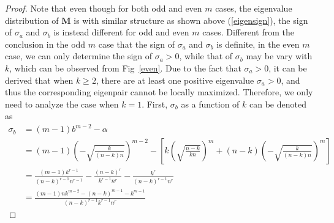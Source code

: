 	
\begin{proof}
Note that even though  for both odd and even $m$ cases, 
the eigenvalue distribution of $\mathbf M$
is with similar structure as shown above  (\ref{eigensign}), 
the sign of    $\sigma_{a}$ and  $\sigma_{b}$
is instead   different for  odd and even $m$ cases.
Different  from  the  conclusion   in the  odd  $m$  case  that  the  sign  of  $\sigma_{a}$ and  $\sigma_{b}$  is  definite,
in  the   even   $m$  case,  we  can  only  determine the  sign  of   $\sigma_{a} > 0$,  while   that of  $\sigma_{b}$  may be  vary  with  $k$,
which     can be  observed from  Fig~\ref{even}.
Due to the  fact  that   $\sigma_{a} > 0$,  it can be  derived  that  when  $k \ge 2$,  there  are  at   least  one  positive   eigenvalue 
$\sigma_{a} > 0$, and  thus  the  corresponding   eigenpair  cannot be  locally  maximized. 
Therefore,  we  only  need  to  analyze the  case  when  $k=1$. 
First,    
$\sigma_{b} $ as  a  function of  $k$  can be  denoted as 
\begin{align}
\sigma_{b}
& =
(m-1)b^{m-2} - \alpha 
\nonumber  \\
&  
=
(m-1)(-  \sqrt{	\frac{k} {(n-k) n}	})^{m-2}  - 
[ k ( \sqrt{	\frac{n-k} { kn}		})^{m} + (n-k) (-  \sqrt{	\frac{k} {(n-k) n}	})^{m} ]
\nonumber  \\
&  =
\frac{ (m-1) k^{r-1}    }
{(n-k)^{r-1}  n^{r-1}   }
-
\frac{  (n-k)^{r}}
{ k^{r-1}  n^{r} }
-
\frac{ k^{r} }
{(n-k)^{r-1}  n^{r}}
\nonumber  \\
&  =
\frac
{  (m-1)nk^{m-2} - (n-k)^{m-1}- k^{m-1}}
{(n-k)^{r-1} k^{r-1}  n^{r}}
\end{align}





\end{proof}

